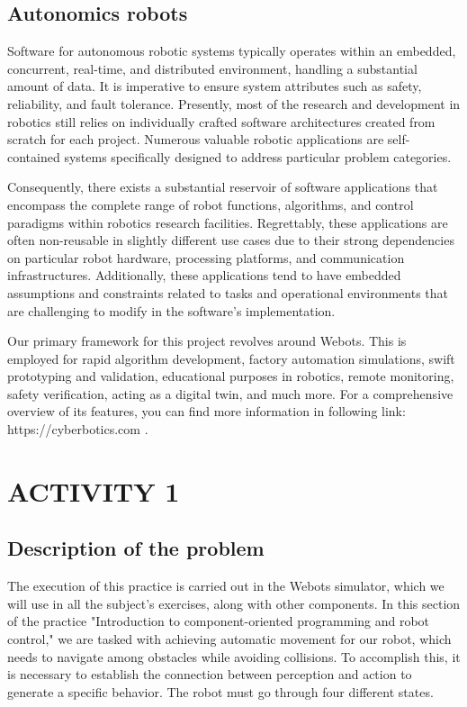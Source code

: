 \documentclass[conference]{IEEEtran}
\begin{document}
\subsection{Autonomics robots}

Software for autonomous robotic systems typically operates within an embedded, concurrent, real-time, and distributed environment, handling a substantial amount of data. It is imperative to ensure system attributes such as safety, reliability, and fault tolerance. Presently, most of the research and development in robotics still relies on individually crafted software architectures created from scratch for each project. Numerous valuable robotic applications are self-contained systems specifically designed to address particular problem categories.

Consequently, there exists a substantial reservoir of software applications that encompass the complete range of robot functions, algorithms, and control paradigms within robotics research facilities. Regrettably, these applications are often non-reusable in slightly different use cases due to their strong dependencies on particular robot hardware, processing platforms, and communication infrastructures. Additionally, these applications tend to have embedded assumptions and constraints related to tasks and operational environments that are challenging to modify in the software's implementation.

Our primary framework for this project revolves around Webots. This is employed for rapid algorithm development, factory automation simulations, swift prototyping and validation, educational purposes in robotics, remote monitoring, safety verification, acting as a digital twin, and much more. For a comprehensive overview of its features, you can find more information in following link: https://cyberbotics.com .


\section{ACTIVITY 1 }


\subsection{Description of the problem}\label{AA}
The execution of this practice is carried out in the Webots simulator, which we will use in all the subject's exercises, along with other components. In this section of the practice "Introduction to component-oriented programming and robot control," we are tasked with achieving automatic movement for our robot, which needs to navigate among obstacles while avoiding collisions. To accomplish this, it is necessary to establish the connection between perception and action to generate a specific behavior. The robot must go through four different states.
\end{document}
